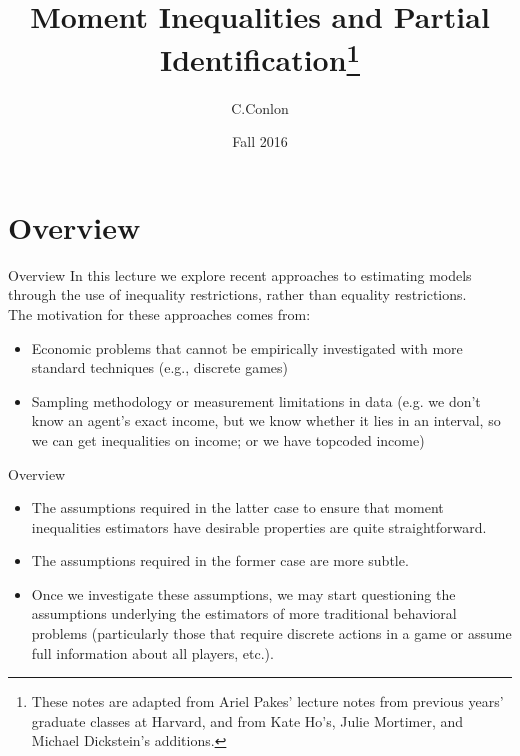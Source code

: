 \documentclass[aspectratio=169,11pt]{beamer}
\title{Moment Inequalities and Partial Identification\thanks{%
These notes are adapted from Ariel Pakes' lecture notes from previous years'
graduate classes at Harvard, and from Kate Ho's, Julie Mortimer, and Michael Dickstein's additions.}}
\author{C.Conlon}
\institute{Grad IO }
\date{Fall 2016}
\begin{document}
\frame[plain]{\titlepage}

\section[Outline]{}

\section{Overview}

\begin{frame}{Overview}
In this lecture we explore recent approaches to estimating models through the use of inequality restrictions, rather than equality restrictions.  \\
\vspace{0.2in}
The motivation for these approaches comes from:

\begin{itemize}
\item Economic problems that cannot be empirically investigated with
more standard techniques (e.g., discrete games)

\item Sampling methodology or measurement limitations in data (e.g. we don't know an agent's exact income, but we know whether it lies in an
interval, so we can get inequalities on income; or
we have topcoded income)
\end{itemize}
\end{frame}


\begin{frame}{Overview}
\begin{itemize}
\item The assumptions required in the latter case to ensure that moment
inequalities estimators have desirable properties are quite straightforward.
\vspace{0.1in}
\item The assumptions required in the former case are more subtle. 
\vspace{0.1in}
\item Once we investigate these assumptions, we may start questioning the assumptions underlying the estimators of more traditional behavioral problems (particularly those that require discrete actions in a game or assume full information about all players, etc.).
\end{itemize}
\end{frame}
\end{document}
